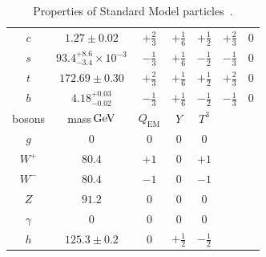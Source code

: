 \begin{table}[tp]
\begin{tabular}{ccccccc}
$c$                         & $1.27 \pm 0.02$                     & $+\frac{2}{3}$       & $+\frac{1}{6}$       & $+\frac{1}{2}$       & $+\frac{2}{3}$       & $0$                  \\
$s$                         & $93.4^{+8.6}_{-3.4}\times10^{-3}$   & $-\frac{1}{3}$       & $+\frac{1}{6}$       & $-\frac{1}{2}$       & $-\frac{1}{3}$       & $0$                  \\
$t$                         & $172.69\pm0.30$                     & $+\frac{2}{3}$       & $+\frac{1}{6}$       & $+\frac{1}{2}$       & $+\frac{2}{3}$       & $0$                  \\
$b$                         & $4.18^{+0.03}_{-0.02}$              & $-\frac{1}{3}$       & $+\frac{1}{6}$       & $-\frac{1}{2}$       & $-\frac{1}{3}$       & $0$                  \\[1em]
bosons                      & mass$\,\eV[G]$                      & $Q_{\mathrm{EM}}$    & $Y$                  & $T^3$                &                      &                      \\[0.2em]
$g$                         & $0$                                 & $0$                  & $0$                  & $0$                  &                      &                      \\
$W^+$                       & $80.4$                              & $+1$                 & $0$                  & $+1$                 &                      &                      \\
$W^-$                       & $80.4$                              & $-1$                 & $0$                  & $-1$                 &                      &                      \\
$Z$                         & $91.2$                              & $0$                  & $0$                  & $0$                  &                      &                      \\
$\gamma$                    & $0$                                 & $0$                  & $0$                  & $0$                  &                      &                      \\
$h$                         & $125.3 \pm 0.2$                     & $0$                  & $+\frac{1}{2}$       & $-\frac{1}{2}$       &                      &
\end{tabular}
\caption[Properties of Standard Model particles]{%
Properties of Standard Model particles~\cite{thomson2013modern,pdg2022ynf}.
}
\end{table}
